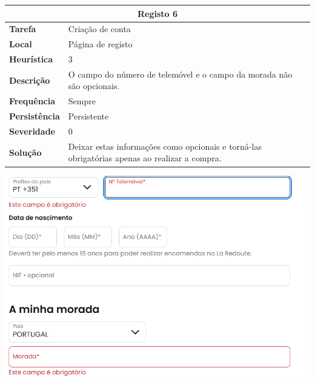 \documentclass[a4paper,12pt]{article}
\begin{document}
\begin{center}
    \newpage
    \begin{table}[h!]
        \centering
        \begin{tabular}{|m{3cm}|m{12cm}|}
        \hline
        \multicolumn{2}{|c|}{\textbf{Registo 6}} \\ \hline
        \textbf{Tarefa}       & Criação de conta \\ \hline
        \textbf{Local}        & Página de registo \\ \hline
        \textbf{Heurística}   & 3  \\ \hline
        \textbf{Descrição}    & O campo do número de telemóvel e o campo da morada não são opcionais. \\ \hline
        \textbf{Frequência}   & Sempre \\ \hline
        \textbf{Persistência} & Persistente \\ \hline
        \textbf{Severidade}   & 0 \\ \hline
        \textbf{Solução}      & Deixar estas informações como opcionais e torná-las obrigatórias apenas ao realizar a compra. \\ \hline
        \end{tabular}
    \end{table}
    
    \vspace{0.5cm}
    \includegraphics[width=\textwidth, keepaspectratio]{heuristics/06telefone_registo.png}


\end{center}
\end{document}
